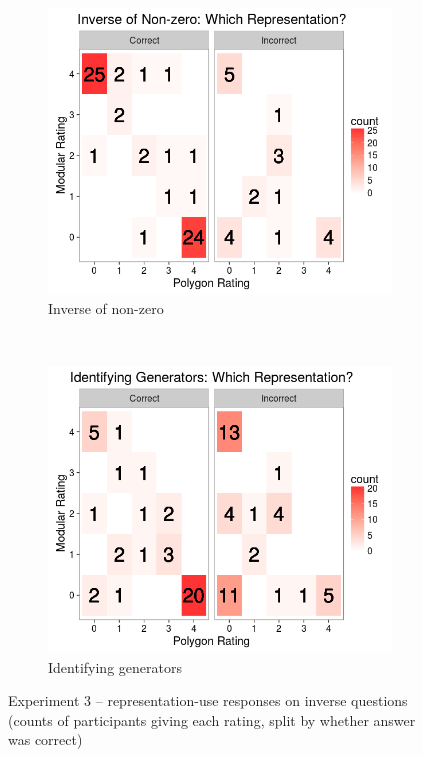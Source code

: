 \documentclass[man,10pt]{apa6}
\begin{document}
\begin{figure}
\begin{subfigure}[c]{0.45\textwidth}
\centering 
\includegraphics[width=\textwidth]{figures/3/wr_inNZ.png}
\caption{Inverse of non-zero}
\end{subfigure}
~
\begin{subfigure}[c]{0.45\textwidth}
\centering 
\includegraphics[width=\textwidth]{figures/3/wr_genT.png}
\caption{Identifying generators}
\end{subfigure}
\caption{Experiment 3 -- representation-use responses on inverse questions (counts of participants giving each rating, split by whether answer was correct)}
\label{ex3_wr}
\end{figure}
\end{document}
